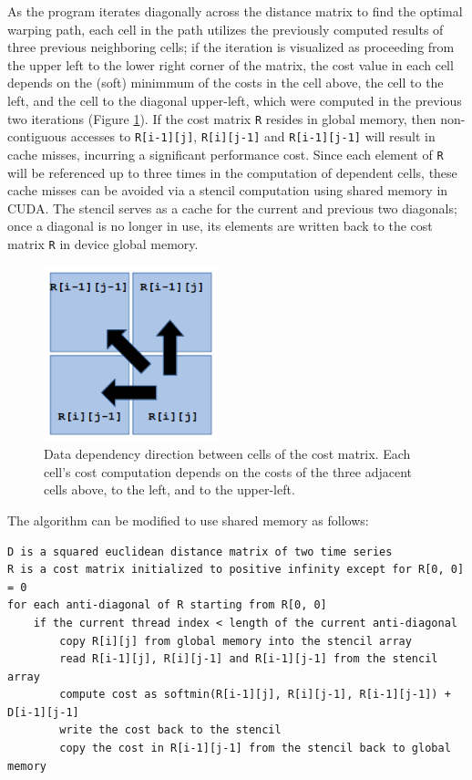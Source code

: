 \documentclass[12pt, letterpaper]{article}
\begin{document}
As the program iterates diagonally across the distance matrix to find the
optimal warping path, each cell in the path utilizes the previously computed
results of three previous neighboring cells; if the iteration is visualized as
proceeding from the upper left to the lower right corner of the matrix, the cost
value in each cell depends on the (soft) minimmum of the costs in the cell
above, the cell to the left, and the cell to the diagonal upper-left, which were
computed in the previous two iterations (Figure \ref{cost_deps}). If the cost
matrix \verb|R| resides in global memory, then non-contiguous accesses to
\verb|R[i-1][j]|, \verb|R[i][j-1]| and \verb|R[i-1][j-1]| will result in cache
misses, incurring a significant performance cost. Since each element of \verb|R|
will be referenced up to three times in the computation of dependent cells,
these cache misses can be avoided via a stencil computation using shared memory
in CUDA. The stencil serves as a cache for the current and previous two
diagonals; once a diagonal is no longer in use, its elements are written back to
the cost matrix \verb|R| in device global memory.

\begin{figure}[htbp]
\includegraphics[height=2in]{img/cost_dependencies.png}
\centering
\caption{Data dependency direction between cells of the cost matrix.
Each cell's cost computation depends on the costs of the three adjacent cells
above, to the left, and to the upper-left.}
\label{cost_deps}
\end{figure}

\FloatBarrier
The algorithm can be modified to use shared memory as follows:

\begin{verbatim}
D is a squared euclidean distance matrix of two time series
R is a cost matrix initialized to positive infinity except for R[0, 0] = 0
for each anti-diagonal of R starting from R[0, 0]
    if the current thread index < length of the current anti-diagonal
        copy R[i][j] from global memory into the stencil array
        read R[i-1][j], R[i][j-1] and R[i-1][j-1] from the stencil array
        compute cost as softmin(R[i-1][j], R[i][j-1], R[i-1][j-1]) + D[i-1][j-1]
        write the cost back to the stencil
        copy the cost in R[i-1][j-1] from the stencil back to global memory
\end{verbatim}
\FloatBarrier
\end{document}
